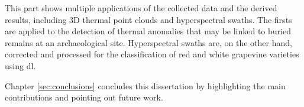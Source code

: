 \small \noindent \textbf{} \normalsize\hspace{\partTabSize} This part shows multiple applications of the collected data and the derived results, including 3D thermal point clouds and hyperspectral swaths. The firsts are applied to the detection of thermal anomalies that may be linked to buried remains at an archaeological site. Hyperspectral swaths are, on the other hand, corrected and processed for the classification of red and white grapevine varieties using \acrshort{dl}.

\small \noindent \textbf{} \normalsize\hspace{\partTabSize} Chapter \ref{sec:conclusions} concludes this dissertation by highlighting the main contributions and pointing out future work.
